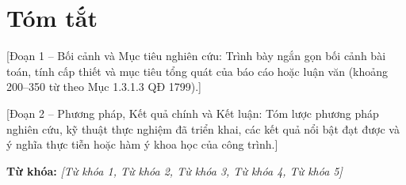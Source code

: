 
\chapter*{Tóm tắt}

[Đoạn 1 -- Bối cảnh và Mục tiêu nghiên cứu: Trình bày ngắn gọn bối cảnh bài toán, tính cấp thiết và mục tiêu tổng quát của báo cáo hoặc luận văn (khoảng 200--350 từ theo Mục 1.3.1.3 QĐ 1799).]

[Đoạn 2 -- Phương pháp, Kết quả chính và Kết luận: Tóm lược phương pháp nghiên cứu, kỹ thuật thực nghiệm đã triển khai, các kết quả nổi bật đạt được và ý nghĩa thực tiễn hoặc hàm ý khoa học của công trình.]

\vspace{0.8cm}
\noindent\textbf{Từ khóa:} \textit{[Từ khóa 1, Từ khóa 2, Từ khóa 3, Từ khóa 4, Từ khóa 5]}
